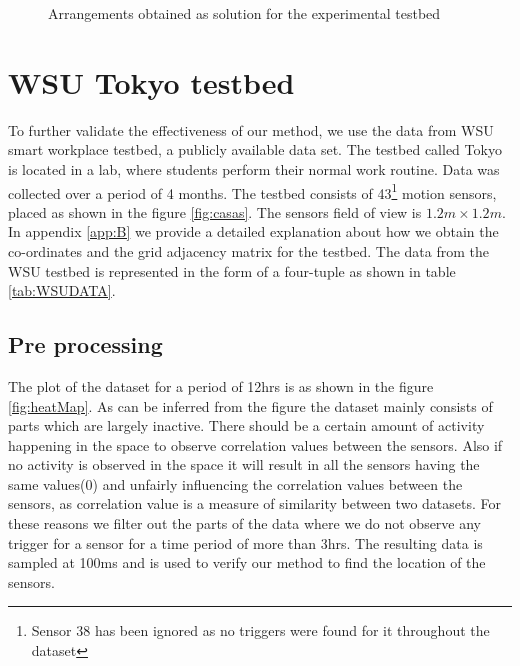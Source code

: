 \begin{figure}[!ht]
\caption{Arrangements obtained as solution for the experimental testbed}
\label{fig:arrangement4x2}
\centering
\end{figure}


\section{WSU Tokyo testbed}
To further validate the effectiveness of our method, we use the data from WSU smart workplace testbed\cite{cook2010detection}, a publicly available data set. The testbed called Tokyo is located in a lab,  where students perform their normal work routine. Data was collected over a period of 4 months. 
The testbed consists of 43\footnote{Sensor 38 has been ignored as no triggers were found for it throughout the dataset} motion sensors, placed as shown in the figure \ref{fig:casas}. The sensors field of view is $1.2m \times 1.2m$. In appendix \ref{app:B} we provide a detailed explanation about how we obtain the co-ordinates and the grid adjacency matrix for the testbed. The data from the WSU testbed is represented in the form of a four-tuple as shown in table \ref{tab:WSUDATA}. 
\subsection{Pre processing}
The plot of the dataset for a period of 12hrs is as shown in the figure \ref{fig:heatMap}. As can be inferred from the figure the dataset mainly consists of parts which are largely inactive. There should be a certain amount of activity happening in the space to observe correlation values between the sensors.  Also if  no activity is observed in the space it will result in all the sensors having the same values(0) and unfairly influencing the correlation values between the sensors, as correlation value is a measure of similarity between two datasets. For these reasons we filter out the parts of the data where we do not observe any trigger for a sensor for a time period of more than 3hrs. The resulting data is sampled at 100ms and is used to verify our method to find the location of the sensors.



